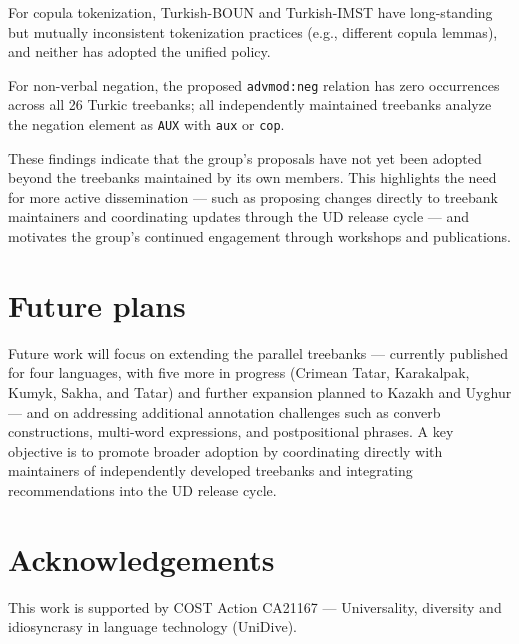 \documentclass[11pt,a4paper]{article}
\begin{document}
For copula tokenization, Turkish-BOUN and Turkish-IMST have long-standing but mutually inconsistent tokenization practices (e.g., different copula lemmas), and neither has adopted the unified policy.

For non-verbal negation, the proposed \texttt{advmod:neg} relation has zero occurrences across all 26 Turkic treebanks; all independently maintained treebanks analyze the negation element as \texttt{AUX} with \texttt{aux} or \texttt{cop}.

These findings indicate that the group's proposals have not yet been adopted beyond the treebanks maintained by its own members. This highlights the need for more active dissemination --- such as proposing changes directly to treebank maintainers and coordinating updates through the UD release cycle --- and motivates the group's continued engagement through workshops and publications.

\section{Future plans}

Future work will focus on extending the parallel treebanks --- currently published for four languages, with five more in progress (Crimean Tatar, Karakalpak, Kumyk, Sakha, and Tatar) and further expansion planned to Kazakh and Uyghur --- and on addressing additional annotation challenges such as converb constructions, multi-word expressions, and postpositional phrases. A key objective is to promote broader adoption by coordinating directly with maintainers of independently developed treebanks and integrating recommendations into the UD release cycle.


\section*{Acknowledgements}

This work is supported by COST Action CA21167 --- Universality, diversity and idiosyncrasy in language technology (UniDive).



\end{document}
